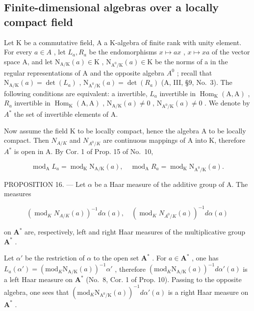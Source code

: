 \subsection{Finite-dimensional algebras over a locally compact field}

Let K be a commutative field, A a K-algebra of finite rank with unity element. For every \(a \in A\) , let \(L_{a}, R_{a}\) be the endomorphisms \(x \mapsto ax\) , \(x \mapsto xa\) of the vector space A, and let \(\mathrm{N}_{\mathrm{A}/\mathrm{K}}(a) \in \mathrm{K}\) , \(\mathrm{N}_{\mathrm{A}^{0}/\mathrm{K}}(a) \in \mathrm{K}\) be the norms of a in the regular representations of A and the opposite algebra \(A^{0}\) ; recall that \(\mathrm{N}_{\mathrm{A}/\mathrm{K}}(a) = \det(L_{a})\) , \(\mathrm{N}_{\mathrm{A}^{0}/\mathrm{K}}(a) = \det(R_{a})\) (A, III, §9, No.~3). The following conditions are equivalent: a invertible, \(L_{a}\) invertible in \(\operatorname{Hom}_{\mathrm{K}}(\mathrm{A}, \mathrm{A})\) , \(R_{a}\) invertible in \(\operatorname{Hom}_{\mathrm{K}}(\mathrm{A}, \mathrm{A})\) , \(\mathrm{N}_{\mathrm{A}/\mathrm{K}}(a) \neq 0\) , \(\mathrm{N}_{\mathrm{A}^{0}/\mathrm{K}}(a) \neq 0\) . We denote by \(A^{*}\) the set of invertible elements of A.

Now assume the field K to be locally compact, hence the algebra A to be locally compact. Then \(N_{A/K}\) and \(N_{A^{0}/K}\) are continuous mappings of A into K, therefore \(A^{*}\) is open in A. By Cor. 1 of Prop. 15 of No.~10,

\[
\operatorname{mod} _ {\mathrm{A}} L _ {a} = \operatorname{mod} _ {\mathrm{K}} \mathrm{N} _ {\mathrm{A} / \mathrm{K}} (a), \quad \operatorname{mod} _ {\mathrm{A}} R _ {a} = \operatorname{mod} _ {\mathrm{K}} \mathrm{N} _ {\mathrm{A} ^ {0} / \mathrm{K}} (a).\tag{38}
\]

PROPOSITION 16. --- Let \(\alpha\) be a Haar measure of the additive group of A. The measures

\[
\left(\operatorname{mod} _ {K} N _ {A / K} (a)\right) ^ {- 1} d \alpha (a), \quad \left(\operatorname{mod} _ {K} N _ {A ^ {0} / K} (a)\right) ^ {- 1} d \alpha (a)
\]

on \(\mathbf{A}^*\) are, respectively, left and right Haar measures of the multiplicative group \(\mathbf{A}^*\) .

Let \(\alpha'\) be the restriction of \(\alpha\) to the open set \(\mathbf{A}^*\) . For \(a \in \mathbf{A}^*\) , one has \(L_a(\alpha') = (\mathrm{mod}_K \mathrm{N}_{\mathrm{A}/\mathrm{K}}(a))^{-1} \alpha'\) , therefore \((\mathrm{mod}_K \mathrm{N}_{\mathrm{A}/\mathrm{K}}(a))^{-1} d\alpha'(a)\) is a left Haar measure on \(\mathbf{A}^*\) (No.~8, Cor. 1 of Prop. 10). Passing to the opposite algebra, one sees that \((\mathrm{mod}_K \mathrm{N}_{\mathrm{A}^0/\mathrm{K}}(a))^{-1} d\alpha'(a)\) is a right Haar measure on \(\mathbf{A}^*\) .

